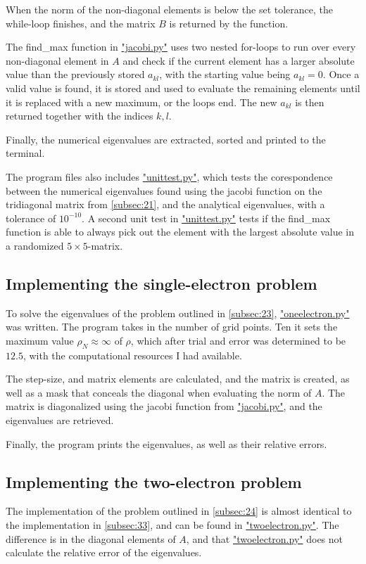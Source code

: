 \documentclass[english,notitlepage,reprint]{revtex4-1}  %
\begin{document}
When the norm of the non-diagonal elements is below the set tolerance, the while-loop finishes, and the matrix \(B\) is returned by the function.

The find\_max function in \hyperref[A:2]{"jacobi.py"} uses two nested for-loops to run over every non-diagonal element in \(A\) and check if the current element has a larger absolute value than the previously stored \(a_{kl}\), with the starting value being \(a_{kl} = 0\). Once a valid value is found, it is stored and used to evaluate the remaining elements until it is replaced with a new maximum, or the loops end. The new \(a_{kl}\) is then returned together with the indices \(k,l\).

Finally, the numerical eigenvalues are extracted, sorted and printed to the terminal.

The program files also includes \hyperref[A:5]{"unittest.py"}, which tests the corespondence between the numerical eigenvalues found using the jacobi function on the tridiagonal matrix from \autoref{subsec:21}, and the analytical eigenvalues, with a tolerance of \(10^{-10}\). A second unit test in \hyperref[A:5]{"unittest.py"} tests if the find\_max function is able to always pick out the element with the largest absolute value in a randomized \(5\times5\)-matrix.

\subsection{Implementing the single-electron problem}\label{subsec:33}
To solve the eigenvalues of the problem outlined in \autoref{subsec:23}, \hyperref[A:3]{"oneelectron.py"} was written. The program takes in the number of grid points. Ten it sets the maximum value \(\rho_{N}\approx\infty\) of \(\rho\), which after trial and error was determined to be \(12.5\), with the computational resources I had available.

The step-size, and matrix elements are calculated, and the matrix is created, as well as a mask that conceals the diagonal when evaluating the norm of \(A\). The matrix is diagonalized using the jacobi function from \hyperref[A:2]{"jacobi.py"}, and the eigenvalues are retrieved.

Finally, the program prints the eigenvalues, as well as their relative errors.

\subsection{Implementing the two-electron problem}\label{subsec:34}
The implementation of the problem outlined in \autoref{subsec:24} is almost identical to the implementation in \autoref{subsec:33}, and can be found in \hyperref[A:4]{"twoelectron.py"}. The difference is in the diagonal elements of \(A\), and that \hyperref[A:4]{"twoelectron.py"} does not calculate the relative error of the eigenvalues.
\end{document}
